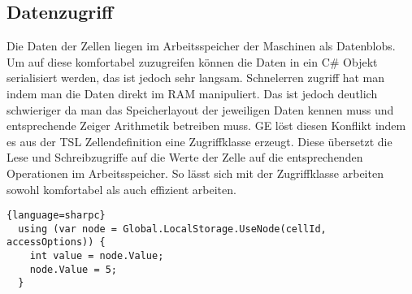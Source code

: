 \subsection{Datenzugriff}

Die Daten der Zellen liegen im Arbeitsspeicher der Maschinen als Datenblobs. Um auf diese komfortabel zuzugreifen können die Daten in ein C\# Objekt
serialisiert werden, das ist jedoch sehr langsam.
Schnelerren zugriff hat man indem man die Daten direkt im RAM manipuliert. Das ist jedoch deutlich schwieriger da man das Speicherlayout der jeweiligen Daten
kennen muss und entsprechende Zeiger Arithmetik betreiben muss. GE löst diesen Konflikt indem es aus der TSL Zellendefinition eine Zugriffklasse erzeugt.
Diese übersetzt die Lese und Schreibzugriffe auf die Werte der Zelle auf die entsprechenden Operationen im Arbeitsspeicher. So lässt sich mit der Zugriffklasse arbeiten sowohl
komfortabel als auch effizient arbeiten.

\begin{lstlisting}{language=sharpc}
  using (var node = Global.LocalStorage.UseNode(cellId, accessOptions)) {
    int value = node.Value;
    node.Value = 5;
  }
\end{lstlisting}
